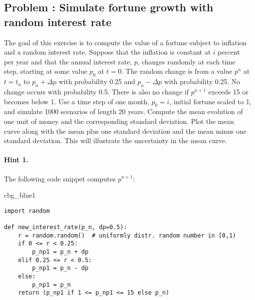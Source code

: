 \documentclass[graybox,sectrefs,envcountresetchap,open=right,final]{svmonodo}
\newenvironment{_cod_tight}[1]{
   \def\FrameCommand{\colorbox{#1}}
   \FrameRule0.6pt\MakeFramed {\FrameRestore}\vskip3mm}
   {\vskip0mm\endMakeFramed}
\newenvironment{cod}[1]{
\bgroup\rmfamily
\fboxsep=0mm\relax
\begin{_cod_tight}{#1}
\list{}{\parsep=-2mm\parskip=0mm\topsep=0pt\leftmargin=2mm
\rightmargin=2\leftmargin\leftmargin=4pt\relax}
\item\relax}
{\endlist\end{_cod_tight}\egroup}
\newenvironment{doconceexercise}{}{}
\newcounter{doconceexercisecounter}
\begin{document}
\begin{doconceexercise}

\subsection*{Problem \thedoconceexercisecounter: Simulate fortune growth with random interest rate}

\label{decay:app:exer:interest}

The goal of this exercise is to compute the value of a fortune subject
to inflation and a random interest rate.
Suppose that the inflation is constant at $i$ percent per year and that the
annual interest rate, $p$, changes randomly at each time step,
starting at some value $p_0$ at $t=0$.
The random change is from a value $p^n$ at $t=t_n$ to
$p_n +\Delta p$ with probability 0.25 and $p_n -\Delta p$ with probability 0.25.
No change occurs with probability 0.5. There is also no change if
$p^{n+1}$ exceeds 15 or becomes below 1.
Use a time step of one month, $p_0=i$, initial fortune scaled to 1,
and simulate 1000 scenarios of
length 20 years. Compute the mean evolution of one unit of money and the
corresponding
standard deviation. Plot the mean curve along with the mean plus one
standard deviation and the mean minus one standard deviation. This will
illustrate the uncertainty in the mean curve.


\paragraph{Hint 1.}
The following code snippet computes $p^{n+1}$:
\begin{cod}{cbg_blue1}\begin{Verbatim}[numbers=none,fontsize=\fontsize{9pt}{9pt},baselinestretch=0.95,xleftmargin=2mm]
import random

def new_interest_rate(p_n, dp=0.5):
    r = random.random()  # uniformly distr. random number in [0,1)
    if 0 <= r < 0.25:
        p_np1 = p_n + dp
    elif 0.25 <= r < 0.5:
        p_np1 = p_n - dp
    else:
        p_np1 = p_n
    return (p_np1 if 1 <= p_np1 <= 15 else p_n)
\end{Verbatim}
\end{cod}
\noindent


\end{doconceexercise}
\end{document}
